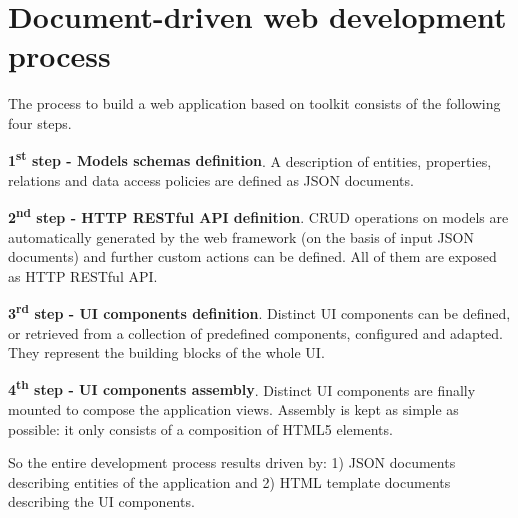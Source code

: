 \section{Document-driven web development process}\label{sec:dev-proc}

The process to build a web application based on  toolkit consists of the following four steps.

{\bf 1\textsuperscript{st} step - Models schemas definition}. A description of entities, properties, relations and data access policies are defined as JSON documents.

{\bf 2\textsuperscript{nd} step - HTTP RESTful API definition}. CRUD operations on models are automatically generated by the web framework (on the basis of input JSON documents) and further custom actions can be defined. All of them are exposed as HTTP RESTful API.

{\bf 3\textsuperscript{rd} step - UI components definition}. Distinct UI components can be defined, or retrieved from a collection of predefined components, configured and adapted. They represent the building blocks of the whole UI.

{\bf 4\textsuperscript{th} step - UI components assembly}. Distinct UI components are finally mounted to compose the application views. Assembly is kept as simple as possible: it only consists of a composition of HTML5 elements.

\vspace{0.2cm}

So the entire development process results driven by: 1) JSON documents describing entities of the application and 2) HTML template documents describing the UI components.



